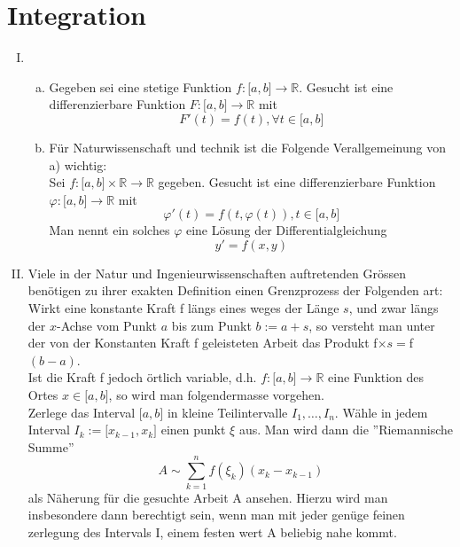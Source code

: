 \chapter{Integration}

\begin{enumerate}[I)]
\item \begin{enumerate}[a)]
\item Gegeben sei eine stetige Funktion $f : \lbrack a,b\rbrack \rightarrow \mathbb{R}$. Gesucht ist eine differenzierbare Funktion $F: \lbrack a,b\rbrack \rightarrow \mathbb{R}$ mit $$F'(t)=f(t), \forall t \in \lbrack a,b \rbrack$$
\item Für Naturwissenschaft und technik ist die Folgende Verallgemeinung von a) wichtig:\\
Sei $f:\lbrack a,b\rbrack \times \mathbb{R} \rightarrow \mathbb{R}$ gegeben. Gesucht ist eine differenzierbare Funktion $\varphi : \lbrack a,b\rbrack \rightarrow \mathbb{R}$ mit $$\varphi ' (t)=f(t,\varphi (t)), t\in \lbrack a,b \rbrack$$ Man nennt ein solches $\varphi$ eine Lösung der Differentialgleichung $$y'=f(x,y)$$
\end{enumerate}
\item Viele in der Natur und Ingenieurwissenschaften auftretenden Grössen benötigen zu ihrer exakten Definition einen Grenzprozess der Folgenden art: \\
Wirkt eine konstante Kraft f längs eines weges der Länge $s$, und zwar längs der $x$-Achse vom Punkt $a$ bis zum Punkt $b:=a+s$, so versteht man unter der von der Konstanten Kraft f geleisteten Arbeit das Produkt f$\times s=$f$(b-a)$. \\
Ist die Kraft f jedoch örtlich variable, d.h. $f:\lbrack a,b\rbrack \rightarrow \mathbb{R}$ eine Funktion des Ortes $x \in \lbrack a,b\rbrack$, so wird man folgendermasse vorgehen.\\

Zerlege das Interval $\lbrack a,b\rbrack$ in kleine Teilintervalle $I_{1},\dots, I_{n}$. Wähle in jedem Interval $I_{k}:=\lbrack x_{k-1}, x_{k}\rbrack$ einen punkt $\xi$ aus. Man wird dann die ''Riemannische Summe'' $$A \sim  \sum\limits_{k = 1}^n {f({\xi_k})({x_k} - {x_{k - 1}})} $$  als Näherung für die gesuchte Arbeit A ansehen. Hierzu wird man insbesondere dann berechtigt sein, wenn man mit jeder genüge feinen zerlegung des Intervals I, einem festen wert A beliebig nahe kommt. 


\end{enumerate}
